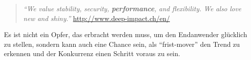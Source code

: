 	\begin{quote}
		\textit{"`We value stability, security, \textbf{performance}, and flexibility. We also love new and shiny."'} \url{http://www.deep-impact.ch/en/} 
	\end{quote}

	Es ist nicht ein Opfer, das erbracht werden muss, um den Endanwender glücklich zu stellen, sondern kann auch eine Chance sein, als "`frist-mover"' den Trend zu erkennen und der Konkurrenz einen Schritt voraus zu sein.

